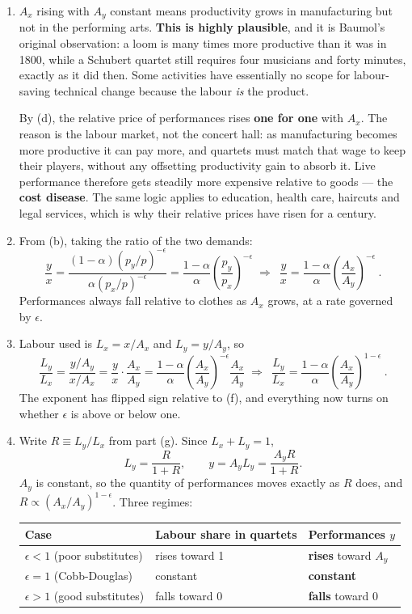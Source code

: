 \documentclass[12pt, letterpaper]{article}
\begin{document}
\begin{tcolorbox}[oddbox,title={Problem 9.3 \quad Baumol's Cost Disease}]
\begin{enumerate}
\item $A_x$ rising with $A_y$ constant means productivity grows in manufacturing but not in the
performing arts. \textbf{This is highly plausible}, and it is Baumol's original observation: a
loom is many times more productive than it was in 1800, while a Schubert quartet still requires
four musicians and forty minutes, exactly as it did then. Some activities have essentially no
scope for labour-saving technical change because the labour \emph{is} the product.

By (d), the relative price of performances rises \textbf{one for one} with $A_x$. The reason is
the labour market, not the concert hall: as manufacturing becomes more productive it can pay
more, and quartets must match that wage to keep their players, without any offsetting
productivity gain to absorb it. Live performance therefore gets steadily more expensive relative
to goods --- the \textbf{cost disease}. The same logic applies to education, health care,
haircuts and legal services, which is why their relative prices have risen for a century.

\item From (b), taking the ratio of the two demands:
\[
\frac{y}{x}=\frac{(1-\alpha)(p_y/p)^{-\epsilon}}{\alpha(p_x/p)^{-\epsilon}}
=\frac{1-\alpha}{\alpha}\left(\frac{p_y}{p_x}\right)^{-\epsilon}
\;\Longrightarrow\;
\boxed{\ \frac{y}{x}=\frac{1-\alpha}{\alpha}\left(\frac{A_x}{A_y}\right)^{-\epsilon}\ }.
\]
Performances always fall relative to clothes as $A_x$ grows, at a rate governed by $\epsilon$.

\item Labour used is $L_x=x/A_x$ and $L_y=y/A_y$, so
\[
\frac{L_y}{L_x}=\frac{y/A_y}{x/A_x}=\frac{y}{x}\cdot\frac{A_x}{A_y}
=\frac{1-\alpha}{\alpha}\left(\frac{A_x}{A_y}\right)^{-\epsilon}\frac{A_x}{A_y}
\;\Longrightarrow\;
\boxed{\ \frac{L_y}{L_x}=\frac{1-\alpha}{\alpha}\left(\frac{A_x}{A_y}\right)^{1-\epsilon}\ }.
\]
The exponent has flipped sign relative to (f), and everything now turns on whether
$\epsilon$ is above or below one.

\item Write $R\equiv L_y/L_x$ from part (g). Since $L_x+L_y=1$,
\[
L_y=\frac{R}{1+R},\qquad y=A_yL_y=\frac{A_yR}{1+R}.
\]
$A_y$ is constant, so the quantity of performances moves exactly as $R$ does, and
$R\propto (A_x/A_y)^{1-\epsilon}$. Three regimes:
\begin{center}
\begin{tabular}{lll}
\toprule
\textbf{Case} & \textbf{Labour share in quartets} & \textbf{Performances $y$} \\
\midrule
$\epsilon<1$ (poor substitutes) & rises toward 1 & \textbf{rises} toward $A_y$ \\
$\epsilon=1$ (Cobb-Douglas) & constant & \textbf{constant} \\
$\epsilon>1$ (good substitutes) & falls toward 0 & \textbf{falls} toward 0 \\
\bottomrule
\end{tabular}
\end{center}


\end{enumerate}
\end{tcolorbox}
\end{document}
